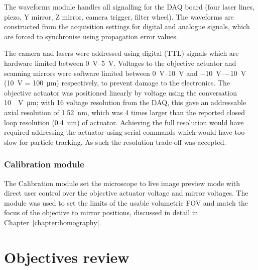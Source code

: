 The waveforms module handles all signalling for the DAQ board (four laser lines, piezo, Y mirror, Z mirror, camera trigger, filter wheel).
The waveforms are constructed from the acquisition settings for digital and analogue signals, which are forced to synchronise using propagation error values.

The camera and lasers were addressed using digital (TTL) signals which are hardware limited between \SIrange{0}{5}{\volt}.
Voltages to the objective actuator and scanning mirrors were software limited between \SIrange{0}{10}{\volt} and \SIrange{-10}{-10}{\volt} (\SI{10}{\volt} = \SI{100}{\micro\meter}) respectively, to prevent damage to the electronics.
The objective actuator was positioned linearly by voltage using the conversation \SI{10}{\per\volt\micro\meter}; with \SI{16}{\bit} voltage resolution from the DAQ, this gave an addressable axial resolution of \SI{1.52}{\nano\meter}, which was 4 times larger than the reported closed loop resolution (\SI{0.4}{\nano\meter}) of actuator.
Achieving the full resolution would have required addressing the actuator using serial commands which would have too slow for particle tracking.
As such the resolution trade-off was accepted.


%
%

\subsubsection{Calibration module}

The Calibration module set the microscope to live image preview mode with direct user control over the objective actuator voltage and mirror voltages.
The module was used to set the limits of the usable volumetric FOV and match the focus of the objective to mirror positions, discussed in detail in Chapter~\ref{chapter:homography}.

\section{Objectives review}


